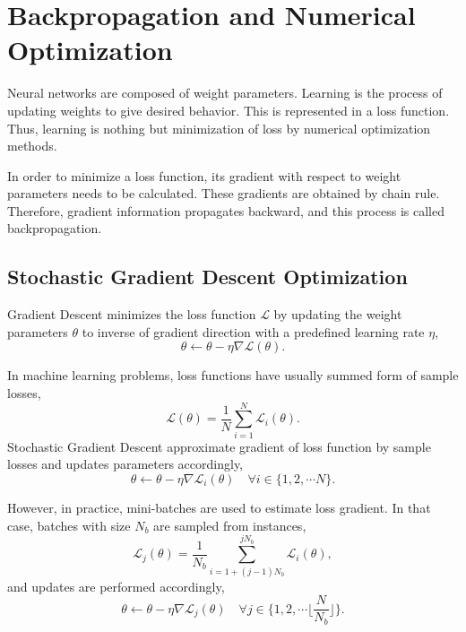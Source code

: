 \section{Backpropagation and Numerical Optimization}
\label{sec:backprop}

Neural networks are composed of weight parameters. 
Learning is the process of updating weights to give desired behavior. 
This is represented in a loss function. Thus, learning is nothing but minimization of loss by numerical optimization methods. 

In order to minimize a loss function, its gradient with respect to weight parameters needs to be calculated. 
These gradients are obtained by chain rule. 
Therefore, gradient information propagates backward, and this process is called backpropagation. 

\subsection{Stochastic Gradient Descent Optimization}

Gradient Descent minimizes the loss function $\mathcal{L}$ by updating the weight parameters $\theta$ to inverse of gradient direction with a predefined learning rate $\eta$, 
\begin{equation}
\label{eq: grad_desc}
\theta \leftarrow \theta - \eta \nabla \mathcal{L}(\theta).
\end{equation}

In machine learning problems, loss functions have usually summed form of sample losses, 
\begin{equation}
\label{eqn:summed_loss}
\mathcal{L}(\theta) = \frac{1}{N} \sum_{i=1}^{N} \mathcal{L}_i(\theta).
\end{equation}
Stochastic Gradient Descent approximate gradient of loss function by sample losses and updates parameters accordingly,
\begin{equation}
\label{eqn:stch_grad_desc}
\theta \leftarrow \theta - \eta \nabla \mathcal{L}_i(\theta) \quad \forall i \in \{1,2, \cdots N\}.
\end{equation}

However, in practice, mini-batches are used to estimate loss gradient. 
In that case, batches with size $N_b$ are sampled from instances, \begin{equation}
\label{eqn:mb_summed_loss}
\mathcal{L}_j(\theta) = \frac{1}{N_b} \sum_{i=1 + (j-1) N_b}^{j N_b} \mathcal{L}_i(\theta),
\end{equation}
and updates are performed accordingly,
\begin{equation}
\label{eqn:mb_grad_desc}
\theta \leftarrow \theta - \eta  \nabla \mathcal{L}_j(\theta) \quad \forall j \in \{1,2, \cdots \Big\lfloor\frac{N}{N_b}\Big\rfloor\}.
\end{equation}

